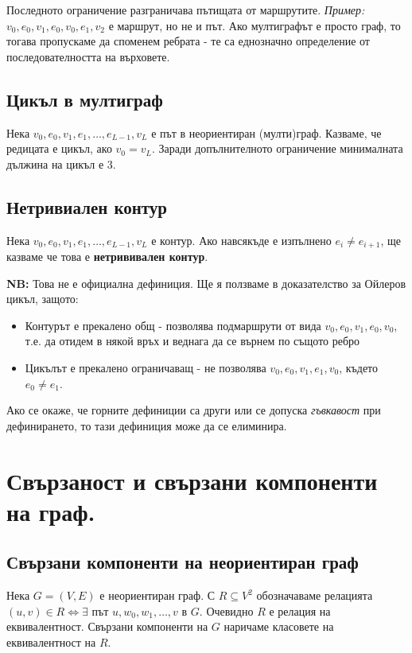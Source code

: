 \documentclass[fleqn,12pt]{article}
\begin{document}
Последното ограничение разграничава пътищата от маршрутите. \textit{Пример:} $v_0, e_0, v_1, e_0, v_0, e_1, v_2$ е маршрут, но не и път.
Ако мултиграфът е просто граф, то тогава пропускаме да споменем ребрата - те са еднозначно определение от последователността на 
върховете.

\subsection{Цикъл в мултиграф}
Нека $v_0, e_0, v_1, e_1, \dots , e_{L-1} , v_L$ е път в неориентиран (мулти)граф. Казваме, че редицата е цикъл, ако $v_0 = v_L$.
Заради допълнителното ограничение минималната дължина на цикъл е 3.

\subsection{Нетривиален контур}
Нека $v_0, e_0, v_1, e_1, \dots, e_{L-1} , v_L$ е контур. Ако навсякъде е изпълнено $e_i \neq e_{i+1}$, ще казваме че това е \textbf{нетрививален контур}.

\textbf{NB: } Това не е официална дефиниция. Ще я ползваме в доказателство за Ойлеров цикъл, защото:
\begin{itemize}
	\item Контурът е прекалено общ - позволява подмаршрути от вида $v_0, e_0, v_1, e_0, v_0$, т.е. да отидем в някой връх и веднага да се върнем по същото ребро 
	\item Цикълът е прекалено ограничаващ - не позволява $v_0, e_0, v_1, e_1, v_0$, където $e_0 \neq e_1$.
\end{itemize}

Ако се окаже, че горните дефиниции са други или се допуска \textit{гъвкавост} при дефинирането, то тази дефиниция може да се елиминира.

\section{Свързаност и свързани компоненти на граф.} 

\subsection{Свързани компоненти на неориентиран граф}
Нека $G = (V, E)$ е неориентиран граф. 
С $R \subseteq V^2$ обозначаваме релацията $ (u, v) \in R \Leftrightarrow \exists $ път $u, w_0, w_1, \dots, v$ в $G$.
Очевидно $R$ е релация на еквивалентност. Свързани компоненти на $G$ наричаме класовете на еквивалентност на $R$.
\end{document}
